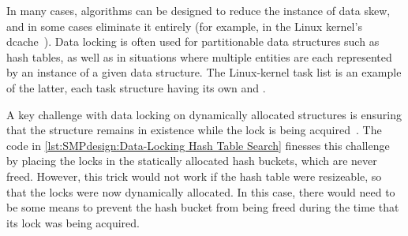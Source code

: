 In many cases, algorithms can be designed to reduce the instance of
data skew, and in some cases eliminate it entirely
(for example, in the Linux kernel's
dcache~\cite{McKenney04a,JonathanCorbet2010dcacheRCU,NeilBrown2015PathnameLookup,NeilBrown2015RCUwalk,NeilBrown2015PathnameSymlinks}).
Data locking is often used for partitionable data structures such as
hash tables, as well as in situations where multiple entities are each
represented by an instance of a given data structure.
The Linux-kernel task list is an example of the latter, each task
structure having its own  and .

A key challenge with data locking on dynamically allocated structures
is ensuring that the structure remains in existence while the lock is
being acquired~\cite{Gamsa99}.
The code in
\cref{lst:SMPdesign:Data-Locking Hash Table Search}
finesses this challenge by placing the locks in the statically allocated
hash buckets, which are never freed.
However, this trick would not work if the hash table were resizeable,
so that the locks were now dynamically allocated.
In this case, there would need to be some means to prevent the hash
bucket from being freed during the time that its lock was being acquired.

